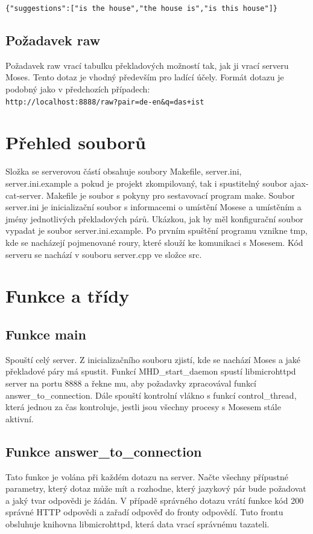 \documentclass[12pt,a4paper]{report}
\begin{document}
{\tt \{"suggestions":["is the house","the house is","is this house"]\} }

\subsection{Požadavek raw}
Požadavek raw vrací tabulku překladových možností tak, jak ji vrací serveru Moses. Tento dotaz je vhodný především pro ladící účely. Formát dotazu je podobný jako v předchozích případech: \\

{\tt http://localhost:8888/raw?pair=de-en\&q=das+ist } \\

\section{Přehled souborů}
Složka se serverovou částí obsahuje soubory Makefile, server.ini, server.ini.example a pokud je projekt zkompilovaný, tak i spustitelný soubor ajax-cat-server. Makefile je soubor s pokyny pro sestavovací program make. Soubor server.ini je inicializační soubor s informacemi o umístění Mosese a umístěním a jmény jednotlivých překladových párů. Ukázkou, jak by měl konfigurační soubor vypadat je soubor server.ini.example. Po prvním spuštění programu vznikne tmp, kde se nacházejí pojmenované roury, které slouží ke komunikaci s Mosesem. Kód serveru se nachází v souboru server.cpp ve složce src.

\section{Funkce a třídy}

\subsection{Funkce main}
Spouští celý server. Z inicializačního souboru zjistí, kde se nachází Moses a jaké překladové páry má spustit. Funkcí MHD\_start\_daemon spustí libmicrohttpd server na portu 8888 a řekne mu, aby požadavky zpracovával funkcí answer\_to\_connection. Dále spouští kontrolní vlákno s funkcí control\_thread, která jednou za čas kontroluje, jestli jsou všechny procesy s Mosesem stále aktivní.

\subsection{Funkce answer\_to\_connection}
Tato funkce je volána při každém dotazu na server. Načte všechny přípustné parametry, který dotaz může mít a rozhodne, který jazykový pár bude požadovat a jaký tvar odpovědi je žádán. V případě správného dotazu vrátí funkce kód 200 správné HTTP odpovědi a zařadí odpověď do fronty odpovědí. Tuto frontu obsluhuje knihovna libmicrohttpd, která data vrací správnému tazateli.
\end{document}
